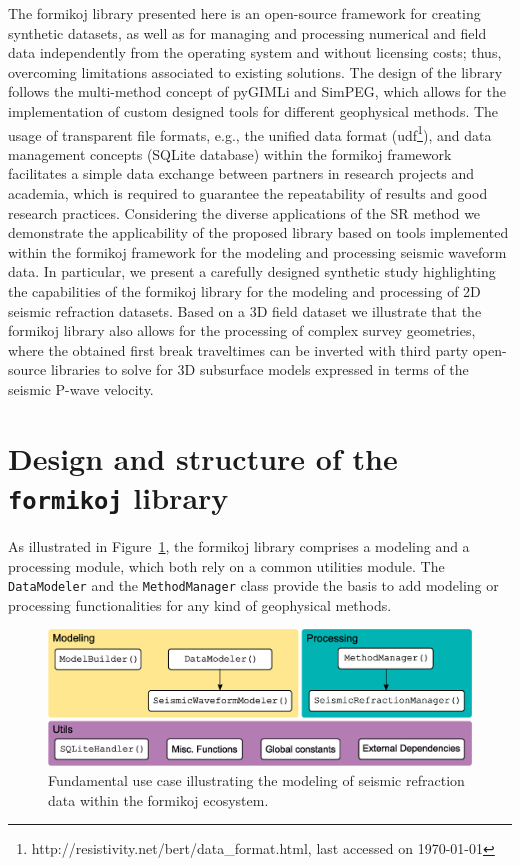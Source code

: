 \documentclass[a4paper,fleqn]{cas-sc}
\begin{document}
The formikoj library presented here is an open-source framework for creating synthetic datasets, as well as for managing and processing numerical and field data independently from the operating system and without licensing costs; thus, overcoming limitations associated to existing solutions. The design of the library follows the multi-method concept of pyGIMLi and SimPEG, which allows for the implementation of custom designed tools for different geophysical methods. 
The usage of transparent file formats, e.g., the unified data format (udf\footnote{http://resistivity.net/bert/data\_format.html, last accessed on \today}), and data management concepts (SQLite database) within the formikoj framework facilitates a simple data exchange between partners in research projects and academia, which is required to guarantee the repeatability of results and good research practices.
Considering the diverse applications of the SR method we demonstrate the applicability of the proposed library based on tools implemented within the formikoj framework for the modeling and processing seismic waveform data. In particular, we present a carefully designed synthetic study highlighting the capabilities of the formikoj library for the modeling and processing of 2D seismic refraction datasets. Based on a 3D field dataset we illustrate that the formikoj library also allows for the processing of complex survey geometries, where the obtained first break traveltimes can be inverted with third party open-source libraries to solve for 3D subsurface models expressed in terms of the seismic P-wave velocity.

\section{Design and structure of the \texttt{formikoj} library}

As illustrated in Figure~\ref{fig:scheme}, the formikoj library comprises a modeling and a processing module, which both rely on a common utilities module. The \texttt{DataModeler} and the \texttt{MethodManager} class provide the basis to add modeling or processing functionalities for any kind of geophysical methods.
\begin{figure}
	\centering
	\includegraphics[width=.75\textwidth]{figures/package_structure}
	\caption{Fundamental use case illustrating the modeling of seismic refraction data within the formikoj ecosystem.}
	\label{fig:scheme}
\end{figure}
\end{document}
